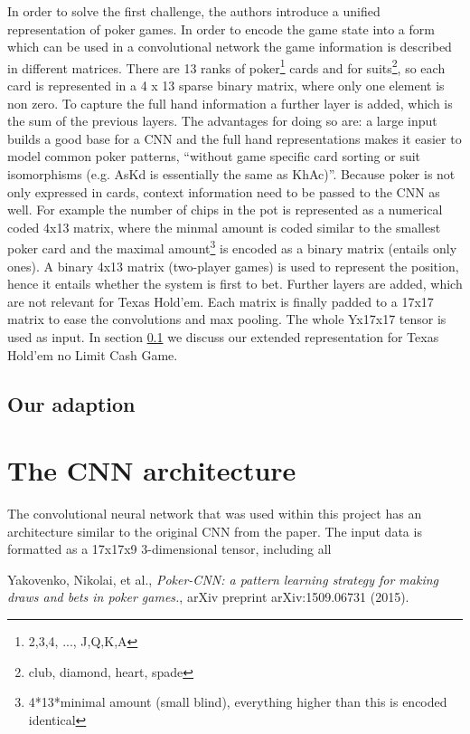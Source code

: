 \documentclass[]{report}
\begin{document}
In order to solve the first challenge, the authors introduce a unified
representation of poker games. In order to encode the game state into
a form which can be used in a convolutional network the game information
is described in different matrices. There are 13 ranks of poker\footnote{2,3,4, ..., J,Q,K,A}
cards and for suits\footnote{club, diamond, heart, spade}, so each
card is represented in a 4 x 13 sparse binary matrix, where only one
element is non zero. To capture the full hand information a further
layer is added, which is the sum of the previous layers. The advantages
for doing so are: a large input builds a good base for a CNN and the
full hand representations makes it easier to model common poker patterns,
``without game specific card sorting or suit isomorphisms (e.g. AsKd
is essentially the same as KhAc)''.\cite{1} Because
poker is not only expressed in cards, context information need to
be passed to the CNN as well. For example the number of chips in the
pot is represented as a numerical coded 4x13 matrix, where the minmal
amount is coded similar to the smallest poker card and the maximal
amount\footnote{4{*}13{*}minimal amount (small blind), everything higher than this
is encoded identical} is encoded as a binary matrix (entails only ones). A binary 4x13
matrix (two-player games) is used to represent the position, hence
it entails whether the system is first to bet. Further layers are
added, which are not relevant for Texas Hold'em. Each matrix is finally
padded to a 17x17 matrix to ease the convolutions and max pooling.
The whole Yx17x17 tensor is used as input. In section \ref{adapted_p}
we discuss our extended representation for Texas Hold'em no Limit
Cash Game.

\subsection{Our adaption} \label{adapted_p}
\section{The CNN architecture}

The convolutional neural network that was used within this project has an architecture similar to the original CNN from the paper\cite{1}. The input data is formatted as a 17x17x9 3-dimensional tensor, including all 



\begin{thebibliography}{}
	 Yakovenko, Nikolai, et al., \emph{Poker-CNN: a pattern learning strategy for making draws and bets in poker games.}, arXiv preprint arXiv:1509.06731 (2015).
\end{thebibliography}  
\end{document}
